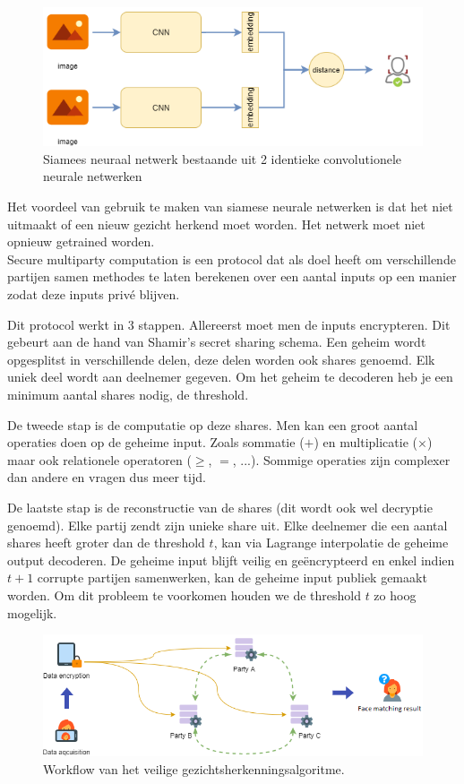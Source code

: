 \begin{figure}[H]
  \includegraphics[width=\linewidth]{fig/siamese.png}
  \caption{Siamees neuraal netwerk bestaande uit 2 identieke convolutionele neurale netwerken}
  \label{fig:dutch_siamese}
\end{figure}

Het voordeel van gebruik te maken van siamese neurale netwerken is dat het niet uitmaakt of een nieuw gezicht herkend moet worden. Het netwerk moet niet opnieuw getrained worden.\\

Secure multiparty computation is een protocol dat als doel heeft om verschillende partijen samen methodes te laten berekenen over een aantal inputs op een manier zodat deze inputs priv\'e blijven.

Dit protocol werkt in 3 stappen. Allereerst moet men de inputs encrypteren. Dit gebeurt aan de hand van Shamir's secret sharing schema. Een geheim wordt opgesplitst in verschillende delen, deze delen worden ook shares genoemd. Elk uniek deel wordt aan deelnemer gegeven. Om het geheim te decoderen heb je een minimum aantal shares nodig, de threshold.

De tweede stap is de computatie op deze shares. Men kan een groot aantal operaties doen op de geheime input. Zoals sommatie ($+$) en multiplicatie ($\times$) maar ook relationele operatoren ($\geq$, $=$, ...). Sommige operaties zijn complexer dan andere en vragen dus meer tijd.

De laatste stap is de reconstructie van de shares (dit wordt ook wel decryptie genoemd). Elke partij zendt zijn unieke share uit. Elke deelnemer die een aantal shares heeft groter dan de threshold $t$, kan via Lagrange interpolatie de geheime output decoderen. De geheime input blijft veilig en ge\"encrypteerd en enkel indien $t+1$ corrupte partijen samenwerken, kan de geheime input publiek gemaakt worden. Om dit probleem te voorkomen houden we de threshold $t$ zo hoog mogelijk.

\begin{figure}[H]
  \includegraphics[width=\linewidth]{fig/workflow.png}
  \caption{Workflow van het veilige gezichtsherkenningsalgoritme.}
  \label{fig:dutch_workflow}
\end{figure}

